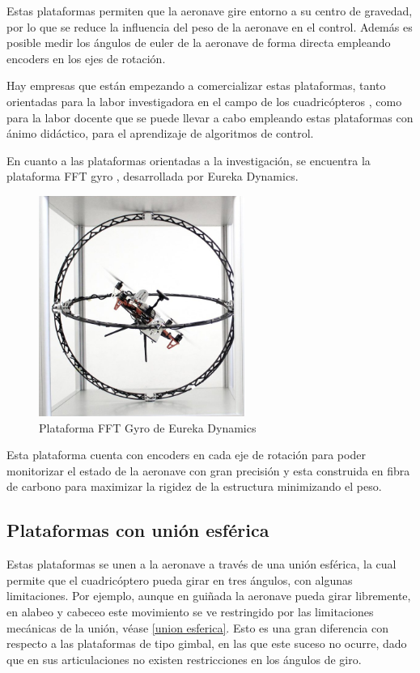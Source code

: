 Estas plataformas permiten que la aeronave gire entorno a su centro de gravedad, por lo que se reduce la influencia del peso de la aeronave en el control. Además es posible medir los ángulos de euler de la aeronave de forma directa empleando encoders en los ejes de rotación.

Hay empresas que están empezando a comercializar estas plataformas, tanto orientadas para la labor investigadora en el campo de los cuadricópteros , como para la labor docente que se puede llevar a cabo empleando estas plataformas con ánimo didáctico, para el aprendizaje de algoritmos de control. 

En cuanto a las  plataformas orientadas a la investigación, se encuentra la plataforma FFT gyro , desarrollada por Eureka Dynamics.

\begin{figure}[htb!]
	\centering
	\includegraphics[width=0.6\textwidth]{estadodelarte/fft_gyro}
	\caption{Plataforma FFT Gyro de Eureka Dynamics}
	\label{giro_fft}
\end{figure}

Esta plataforma cuenta con encoders en cada eje de rotación para poder monitorizar el estado de la aeronave con gran precisión y esta construida en fibra de carbono para maximizar la rigidez de la estructura minimizando el peso.

\subsection{Plataformas con unión esférica}

Estas plataformas se unen a la aeronave a través de una unión esférica, la cual permite que el cuadricóptero pueda girar en tres ángulos, con algunas limitaciones. Por ejemplo, aunque en guiñada la aeronave pueda girar libremente, en alabeo y cabeceo este movimiento se ve restringido por las limitaciones mecánicas de la unión, véase \cref{union esferica}. Esto es una gran diferencia con respecto a las plataformas de tipo gimbal, en las que este suceso no ocurre, dado que en sus articulaciones no existen restricciones en los ángulos de giro.

